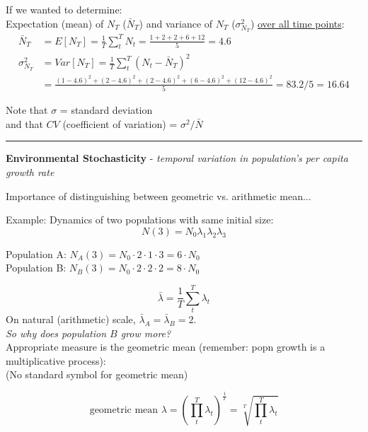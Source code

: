 \documentclass{article}
\newcommand{\ind}{\-\hspace{1cm}}
\begin{document}
If we wanted to determine:\\
Expectation (mean) of $N_T$ ($\bar{N}_T$) and variance of $N_T$ ($\sigma_{N_T}^2$) \underline{over all time points}:
\begin{align*}
	\bar{N}_T &= E[N_T] = \frac{1}{T}\sum_t^T N_t = \frac{1+2+2+6+12}{5} = 4.6\\
	\sigma_{N_T}^2 & = Var[N_T] =  \frac{1}{T}\sum_t^T (N_t - \bar{N}_T)^2\\
	& = \frac{(1-4.6)^2 + (2-4.6)^2 + (2-4.6)^2 + (6-4.6)^2 + (12-4.6)^2}{5} = 83.2/5 = 16.64
\end{align*}

Note that $\sigma$ = standard deviation\\
\ind and that $CV$ (coefficient of variation) = $\sigma^2/\bar{N}$

\rule[0.5ex]{\linewidth}{1pt}

\pagebreak

\textbf{Environmental Stochasticity} - \emph{temporal variation in population's per capita growth rate}

Importance of distinguishing between geometric vs. arithmetic mean...

Example: Dynamics of two populations with same initial size:
\begin{equation*}
	N(3) = N_0 \lambda_1 \lambda_2 \lambda_3
\end{equation*}
\begin{center}
	Population A: $N_A(3) = N_0 \cdot 2 \cdot 1 \cdot 3 = 6 \cdot N_0$\\
	Population B: $N_B(3) = N_0 \cdot 2 \cdot 2 \cdot 2 = 8 \cdot N_0$
\end{center}

\begin{equation*}
	\bar{\lambda} = \frac{1}{T} \sum_t^T \lambda_t
\end{equation*}
On natural (arithmetic) scale, $\bar{\lambda}_A = \bar{\lambda}_B = 2$.\\

\emph{So why does population $B$ grow more?}\\
Appropriate measure is the geometric mean (remember: popn growth is a multiplicative process):\\
(No standard symbol for geometric mean)

\begin{equation*}
	\text{geometric mean }\lambda = \left(\prod_t^T \lambda_t\right)^{\frac{1}{T}} = \sqrt[T]{\prod_t^T \lambda_t}
\end{equation*}
\end{document}
